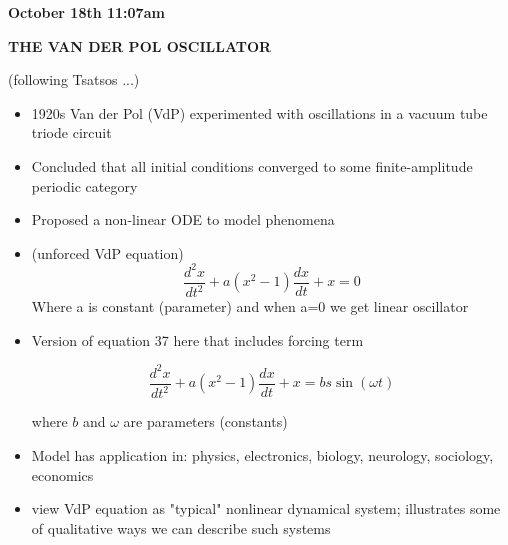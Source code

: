 \textbf{October 18th 11:07am}

\textbf{THE VAN DER POL OSCILLATOR }\newline 


(following Tsatsos ...)

\begin{itemize}
    \item 1920s Van der Pol (VdP) experimented with oscillations in a vacuum tube triode circuit
    \item Concluded that all initial conditions converged to some finite-amplitude periodic category
    \item Proposed a non-linear ODE to model phenomena
    \item (unforced VdP equation)
    \begin{equation}
        \frac{d^2x}{dt^2}+ a(x^2-1) \frac{dx}{dt} + x = 0
    \end{equation}
    Where a is constant (parameter) and when a=0 we get linear oscillator

    \item Version of equation 37 here that includes forcing term

    \[ \frac{d^2x}{dt^2} + a(x^2-1) \frac{dx}{dt} + x = b s\sin(\omega t)\]

    where $b$ and $\omega$ are parameters (constants)

    \item Model has application in: physics, electronics, biology, neurology, sociology, economics
    \item view VdP equation as "typical" nonlinear dynamical system; illustrates some of qualitative ways we can describe such systems
\end{itemize}

